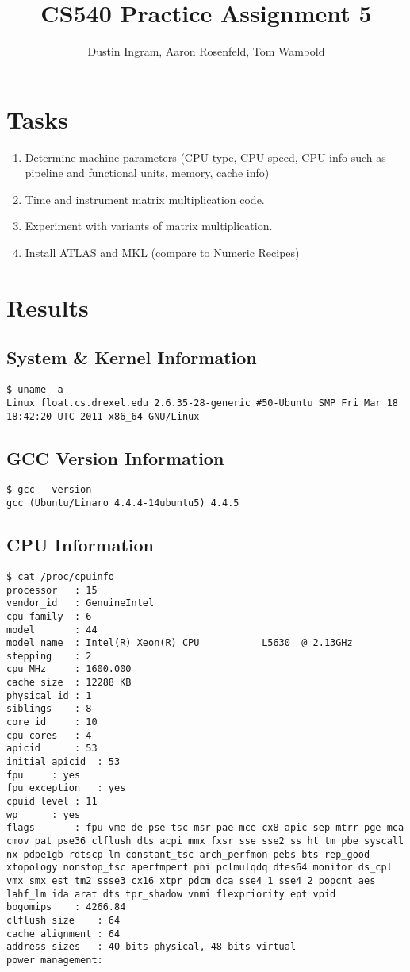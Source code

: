 \documentclass{article}
\title{CS540 Practice Assignment 5}
\author{Dustin Ingram, Aaron Rosenfeld, Tom Wambold}
\begin{document}
\maketitle
\newpage
\section{Tasks}
\begin{enumerate}
    \item Determine machine parameters (CPU type, CPU speed, CPU info such as pipeline and functional units, memory, cache info)
    \item Time and instrument matrix multiplication code.
    \item Experiment with variants of matrix multiplication.
    \item Install ATLAS and MKL (compare to Numeric Recipes)
\end{enumerate}
\newpage
\section{Results}
\subsection{System \& Kernel Information}
\begin{lstlisting}
$ uname -a
Linux float.cs.drexel.edu 2.6.35-28-generic #50-Ubuntu SMP Fri Mar 18 18:42:20 UTC 2011 x86_64 GNU/Linux
\end{lstlisting}
\subsection{GCC Version Information}
\begin{lstlisting}
$ gcc --version
gcc (Ubuntu/Linaro 4.4.4-14ubuntu5) 4.4.5
\end{lstlisting}
\subsection{CPU Information}
\begin{lstlisting}
$ cat /proc/cpuinfo
processor	: 15
vendor_id	: GenuineIntel
cpu family	: 6
model		: 44
model name	: Intel(R) Xeon(R) CPU           L5630  @ 2.13GHz
stepping	: 2
cpu MHz		: 1600.000
cache size	: 12288 KB
physical id	: 1
siblings	: 8
core id		: 10
cpu cores	: 4
apicid		: 53
initial apicid	: 53
fpu		: yes
fpu_exception	: yes
cpuid level	: 11
wp		: yes
flags		: fpu vme de pse tsc msr pae mce cx8 apic sep mtrr pge mca cmov pat pse36 clflush dts acpi mmx fxsr sse sse2 ss ht tm pbe syscall nx pdpe1gb rdtscp lm constant_tsc arch_perfmon pebs bts rep_good xtopology nonstop_tsc aperfmperf pni pclmulqdq dtes64 monitor ds_cpl vmx smx est tm2 ssse3 cx16 xtpr pdcm dca sse4_1 sse4_2 popcnt aes lahf_lm ida arat dts tpr_shadow vnmi flexpriority ept vpid
bogomips	: 4266.84
clflush size	: 64
cache_alignment	: 64
address sizes	: 40 bits physical, 48 bits virtual
power management:
\end{lstlisting}
\end{document}
